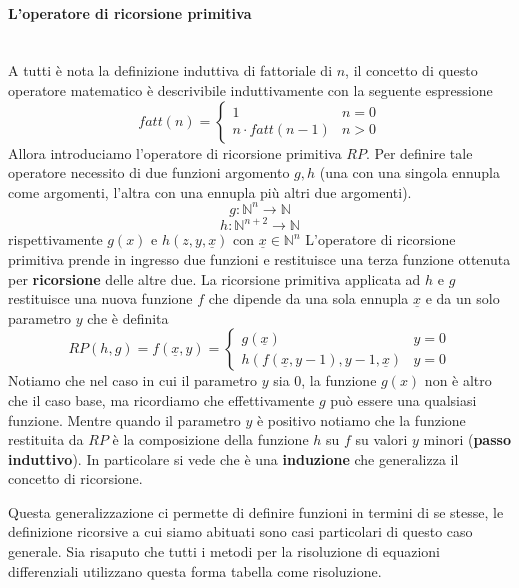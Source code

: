 \documentclass{article}
\begin{document}
\paragraph{L'operatore di ricorsione primitiva}\mbox{}\\
A tutti è nota la definizione induttiva di fattoriale di $n$, il concetto di questo
operatore matematico è descrivibile induttivamente con la seguente espressione
\[
    fatt(n)=
    \begin{cases}
        1                & n=0 \\
        n\cdot fatt(n-1) & n>0
    \end{cases}
\]
Allora introduciamo l'operatore di ricorsione primitiva $RP$. Per definire tale
operatore necessito di due funzioni argomento $g,h$ (una con una singola ennupla come
argomenti, l'altra con una ennupla più altri due argomenti).
$$g:\mathbb{N}^n\rightarrow\mathbb{N}$$
$$h:\mathbb{N}^{n+2}\rightarrow\mathbb{N}$$
rispettivamente $g(x)$ e $h(z,y,\underline{x})$ con $\underline{x}\in\mathbb{N}^n$
L'operatore di ricorsione primitiva prende in ingresso due funzioni e restituisce
una terza funzione ottenuta per \textbf{ricorsione} delle altre due. La ricorsione
primitiva applicata ad $h$ e $g$ restituisce una nuova funzione $f$ che dipende da
una sola ennupla $\underline{x}$ e da un solo parametro $y$ che è definita
\[
    RP(h,g)=f(\underline{x},y)=
    \begin{cases}
        g(\underline{x})                          & y=0 \\
        h(f(\underline{x},y-1),y-1,\underline{x}) & y=0
    \end{cases}
\]
Notiamo che nel caso in cui il parametro $y$ sia 0, la funzione $g(x)$ non è altro che
il caso base, ma ricordiamo che effettivamente $g$ può essere una qualsiasi funzione.
Mentre quando il parametro $y$ è positivo notiamo che la funzione restituita da $RP$ è
la composizione della funzione $h$ su $f$ su valori $y$ minori (\textbf{passo induttivo}).
In particolare si vede che è una \textbf{induzione} che generalizza il concetto di ricorsione.

Questa generalizzazione ci permette di definire funzioni in termini di se stesse, le
definizione ricorsive a cui siamo abituati sono casi particolari di questo caso generale. Sia
risaputo che tutti i metodi per la risoluzione di equazioni differenziali utilizzano
questa forma tabella come risoluzione.
\end{document}
